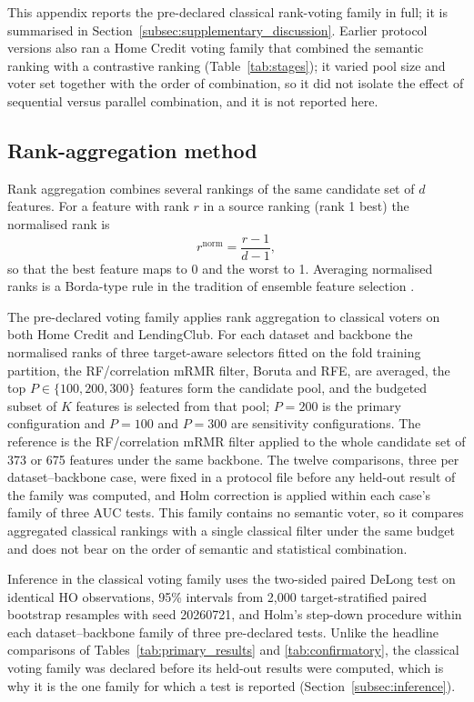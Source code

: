 \documentclass[final,5p,twocolumn]{elsarticle}
\newcommand{\Kfeat}{K}
\begin{document}
This appendix reports the pre-declared classical rank-voting family in full; it is summarised in Section~\ref{subsec:supplementary_discussion}. Earlier protocol versions also ran a Home Credit voting family that combined the semantic ranking with a contrastive ranking (Table~\ref{tab:stages}); it varied pool size and voter set together with the order of combination, so it did not isolate the effect of sequential versus parallel combination, and it is not reported here.

\subsection{Rank-aggregation method}
\label{subsec:voting_fs}

Rank aggregation combines several rankings of the same candidate set of $d$ features. For a feature with rank $r$ in a source ranking (rank 1 best) the normalised rank is
\begin{equation}
    r^{\mathrm{norm}}=\frac{r-1}{d-1},
    \label{eq:normrank}
\end{equation}
so that the best feature maps to 0 and the worst to 1. Averaging normalised ranks is a Borda-type rule \cite{dwork2001} in the tradition of ensemble feature selection \cite{saeys2008}.

The pre-declared voting family applies rank aggregation to classical voters on both Home Credit and LendingClub. For each dataset and backbone the normalised ranks of three target-aware selectors fitted on the fold training partition, the RF/correlation mRMR filter, Boruta and RFE, are averaged, the top $P\in\{100,200,300\}$ features form the candidate pool, and the budgeted subset of $\Kfeat$ features is selected from that pool; $P=200$ is the primary configuration and $P=100$ and $P=300$ are sensitivity configurations. The reference is the RF/correlation mRMR filter applied to the whole candidate set of 373 or 675 features under the same backbone. The twelve comparisons, three per dataset--backbone case, were fixed in a protocol file before any held-out result of the family was computed, and Holm correction is applied within each case's family of three AUC tests. This family contains no semantic voter, so it compares aggregated classical rankings with a single classical filter under the same budget and does not bear on the order of semantic and statistical combination.

Inference in the classical voting family uses the two-sided paired DeLong test \cite{delong1988} on identical HO observations, 95\% intervals from 2,000 target-stratified paired bootstrap resamples with seed 20260721, and Holm's step-down procedure \cite{holm1979} within each dataset--backbone family of three pre-declared tests. Unlike the headline comparisons of Tables~\ref{tab:primary_results} and \ref{tab:confirmatory}, the classical voting family was declared before its held-out results were computed, which is why it is the one family for which a test is reported (Section~\ref{subsec:inference}).
\end{document}
